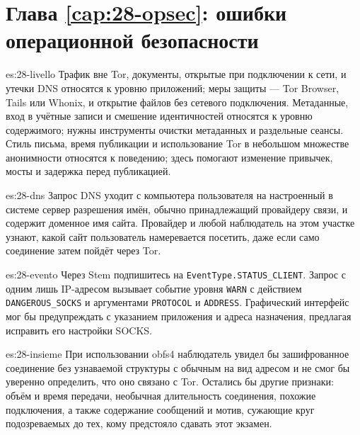 \section*{Глава \ref{cap:28-opsec}: ошибки операционной безопасности}

\begin{soluzione}{es:28-livello}
Трафик вне Tor, документы, открытые при подключении к сети, и утечки DNS относятся к уровню приложений; меры защиты — Tor Browser, Tails или Whonix,  и открытие файлов без сетевого подключения. Метаданные, вход в учётные записи и смешение идентичностей относятся к уровню содержимого; нужны инструменты очистки метаданных и раздельные сеансы. Стиль письма, время публикации и использование Tor в небольшом множестве анонимности относятся к поведению; здесь помогают изменение привычек, мосты и задержка перед публикацией.
\end{soluzione}

\begin{soluzione}{es:28-dns}
Запрос DNS уходит с компьютера пользователя на настроенный в системе сервер разрешения имён, обычно принадлежащий провайдеру связи, и содержит доменное имя сайта. Провайдер и любой наблюдатель на этом участке узнают, какой сайт пользователь намеревается посетить, даже если само соединение затем пойдёт через Tor.
\end{soluzione}

\begin{soluzione}{es:28-evento}
Через Stem подпишитесь на \texttt{EventType.STATUS\_CLIENT}. Запрос с одним лишь IP-адресом вызывает событие уровня \texttt{WARN} с действием \texttt{DANGEROUS\_SOCKS} и аргументами \texttt{PROTOCOL} и \texttt{ADDRESS}. Графический интерфейс мог бы предупреждать с указанием приложения и адреса назначения, предлагая исправить его настройки SOCKS.
\end{soluzione}

\begin{soluzione}{es:28-insieme}
При использовании obfs4 наблюдатель увидел бы зашифрованное соединение без узнаваемой структуры с обычным на вид адресом и не смог бы уверенно определить, что оно связано с Tor. Остались бы другие признаки: объём и время передачи, необычная длительность соединения, похожие подключения, а также содержание сообщений и мотив, сужающие круг подозреваемых до тех, кому предстояло сдавать этот экзамен.
\end{soluzione}

